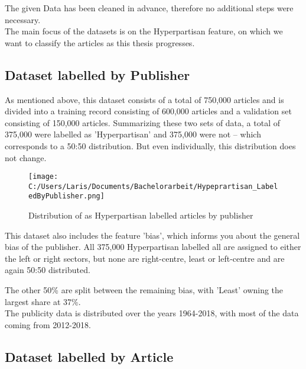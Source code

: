 \documentclass[11pt,titlepage,oneside,openany]{book}
\begin{document}
 \noindent The given Data has been cleaned in advance, therefore no additional steps were necessary.\\ 
 The main focus of the datasets is on the Hyperpartisan feature, on which we want to classify the articles as this thesis progresses.
 

\subsection{Dataset labelled by Publisher}
As mentioned above, this dataset consists of a total of 750,000 articles and is divided into a training record consisting of 600,000 articles and a validation set consisting of 150,000 articles. Summarizing these two sets of data, a total of 375,000 were labelled as 'Hyperpartisan' and 375,000 were not – which corresponds to a 50:50 distribution. But even individually, this distribution does not change. 
\begin{figure}[h]
	\centering
	\texttt{[image: C:/Users/Laris/Documents/Bachelorarbeit/Hypeprartisan\_LabeledByPublisher.png]}
	\caption{Distribution of as Hyperpartisan labelled articles by publisher}
	\label{fig:example}
\end{figure}

\noindent This dataset also includes the feature 'bias', which informs you about the general bias of the publisher. All 375,000 Hyperpartisan labelled all are assigned to either the left or right sectors, but none are right-centre, least or left-centre and are again 50:50 distributed.


\noindent The other 50\% are split between the remaining bias, with 'Least' owning the largest share at 37\%.\\
The publicity data is distributed over the years 1964-2018, with most of the data coming from 2012-2018.
\begin{figure}[h]
\end{figure}


\subsection{Dataset labelled by Article}
\end{document}
